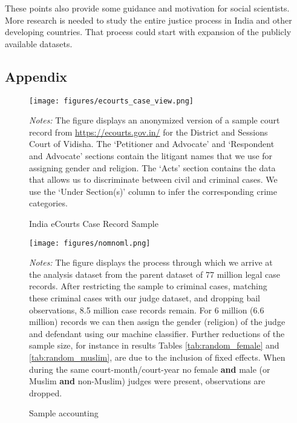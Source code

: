 \documentclass[12pt,english]{article}
\begin{document}
These points also provide some guidance and motivation for social scientists. More research is needed to study the entire justice process in India and other developing countries. That process could start with expansion of the publicly available datasets.

\clearpage





\clearpage

 
\begin{appendices}

\setcounter{figure}{0} 
\renewcommand{\thefigure}{A\arabic{figure}} 
\setcounter{table}{0} \renewcommand{\thetable}{A\arabic{table}} 


\section{Appendix}

\begin{figure}[htp!]
 \centering
 \caption{India eCourts Case Record Sample}
 \texttt{[image: figures/ecourts\_case\_view.png]}
 \label{fig:ecourts_case_view}
 \begin{minipage}{1.0\textwidth}
    {\scriptsize \emph{Notes:} The figure displays an anonymized version of a sample court record from \url{https://ecourts.gov.in/} for the District and Sessions Court of Vidisha. The `Petitioner and Advocate' and `Respondent and Advocate' sections contain the litigant names that we use for assigning gender and religion. The `Acts' section contains the data that allows us to discriminate between civil and criminal cases. We use the `Under Section(s)' column to infer the corresponding crime categories.\par}
 \end{minipage}
\end{figure}

\newpage

\begin{figure}[htp!]
 \centering
 \caption{Sample accounting}
 \texttt{[image: figures/nomnoml.png]}
 \label{fig:nomnoml}
 \begin{minipage}{1.0\textwidth}
    {\scriptsize \emph{Notes:} The figure displays the process through which we arrive at the analysis dataset from the parent dataset of 77 million legal case records. After restricting the sample to criminal cases, matching these criminal cases with our judge dataset, and dropping bail observations, 8.5 million case records remain. For 6 million (6.6 million) records we can then assign the gender (religion) of the judge and defendant using our machine classifier. Further reductions of the sample size, for instance in results Tables \ref{tab:random_female} and \ref{tab:random_muslim}, are due to the inclusion of fixed effects. When during the same court-month/court-year no female \textbf{and} male (or Muslim \textbf{and} non-Muslim) judges were present, observations are dropped.\par}
 \end{minipage}
\end{figure}


\end{appendices}
\end{document}
